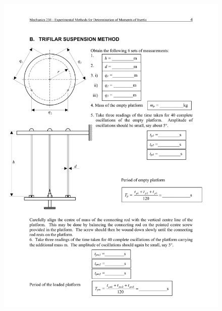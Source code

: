 \begin{figure}
 \includegraphics[width=\linewidth]{lab1/lab1-4}
  \caption*{}
\label{}
\end{figure}
